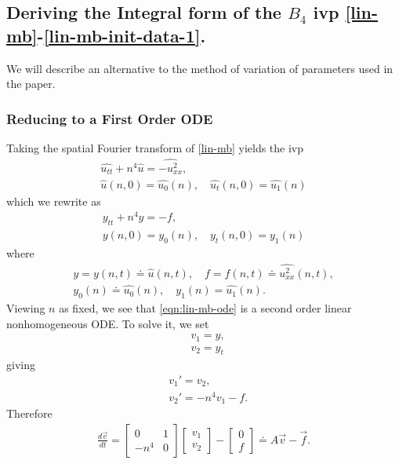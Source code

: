 \documentclass[12pt,reqno]{amsart}
\numberwithin{equation}{section}  %
\numberwithin{figure}{section}
\newcommand{\wh}{\widehat}
\theoremstyle{plain}
\theoremstyle{definition}
\theoremstyle{remark}
\begin{document}
\subsection{Deriving the Integral form of the $B_{4}$ ivp
\eqref{lin-mb}-\eqref{lin-mb-init-data-1}.} 
\label{ssec:integral-form-deriv}
We will describe an alternative to the method of variation of parameters used in
the paper. 
%
%
\subsubsection{Reducing to a First Order ODE} 
\label{sssec:first-order-ode}
Taking the spatial Fourier transform of \eqref{lin-mb} yields
the ivp
%
%
\begin{gather*}
  \wh{u_{tt}} + n^{4} \wh{u} = \wh{-u^{2}_{xx}},
  \\
  \wh{u}(n, 0) = \wh{u_{0}}(n), \quad \wh{u_{t}}(n, 0) = \wh{u_{1}}(n)
\end{gather*}
%
%
which we rewrite as 
%
%
\begin{gather}
  \label{eqn:lin-mb-ode}
  y_{tt} + n^{4}y = -f,
  \\
  y(n, 0) = y_{0}(n), \quad y_{t}(n, 0) = y_{1}(n)
\label{eqn:lin-mb-ode-init-data}
\end{gather}
%
%
where
%
%
\begin{gather*}
  \label{not-1}
  y = y(n, t) \doteq \wh{u}(n, t), \quad f = f(n, t) \doteq
  \wh{u^{2}_{xx}}(n,t),
  \\
  \label{not-2}
  y_{0}(n) \doteq \wh{u_{0}}(n), \quad y_{1}(n) = \wh{u_{1}}(n).
\end{gather*}
%
%
Viewing $n$ as fixed, we see that \eqref{eqn:lin-mb-ode} is a second order
linear nonhomogeneous ODE. To solve it, we set 
%
%
\begin{equation*}
  \label{not-3}
\begin{split}
   & v_{1} = y, 
   \\
   & v_{2} = y_{t}
\end{split}
\end{equation*}
%
%
giving
%
%
\begin{equation*}
\begin{split}
  & v_{1}' = v_{2},
  \\
  & v_{2}' = -n^{4}v_{1} - f.
\end{split}
\end{equation*}
%
%
Therefore 
%
%
\begin{equation}
\begin{split}
\frac{d \vec v}{dt} = 
\begin{bmatrix}
0 & 1 \\
-n^{4} & 0
\end{bmatrix}
\begin{bmatrix}
  v_{1}\\
  v_{2}
\end{bmatrix}
-
\begin{bmatrix}
0\\
f
\end{bmatrix}
\doteq A \vec v - \vec f.
\end{split}
\label{eqn:first-order-ode-reduction}
\end{equation}
\end{document}
